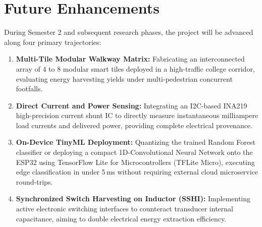 \section{Future Enhancements}
During Semester 2 and subsequent research phases, the project will be advanced along four primary trajectories:
\begin{enumerate}
    \item \textbf{Multi-Tile Modular Walkway Matrix:} Fabricating an interconnected array of 4 to 8 modular smart tiles deployed in a high-traffic college corridor, evaluating energy harvesting yields under multi-pedestrian concurrent footfalls.
    \item \textbf{Direct Current and Power Sensing:} Integrating an I2C-based INA219 high-precision current shunt IC to directly measure instantaneous milliampere load currents and delivered power, providing complete electrical provenance.
    \item \textbf{On-Device TinyML Deployment:} Quantizing the trained Random Forest classifier or deploying a compact 1D-Convolutional Neural Network onto the ESP32 using TensorFlow Lite for Microcontrollers (TFLite Micro), executing edge classification in under 5\,ms without requiring external cloud microservice round-trips.
    \item \textbf{Synchronized Switch Harvesting on Inductor (SSHI):} Implementing active electronic switching interfaces to counteract transducer internal capacitance, aiming to double electrical energy extraction efficiency.
\end{enumerate}
